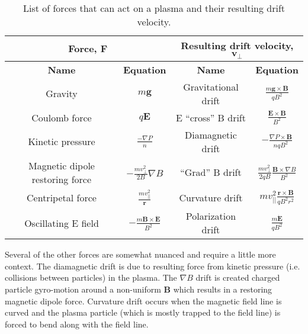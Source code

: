 \documentclass[12pt]{iopart}
\begin{document}
\renewcommand{\arraystretch}{1.5} %
\begin{table}[h]
\centering
\begin{tabular}{|c|c|c|c|}
\hline
\multicolumn{2}{|c|}{\textbf{Force}, $\mathbf{F}$}    & \multicolumn{2}{c|}{\textbf{Resulting drift velocity}, $\mathbf{v}_\perp$} \\ \hline 
\textbf{Name}       & \textbf{Equation} & \textbf{Name}       & \textbf{Equation}      \\ \hline
Gravity             & $m\mathbf{g}$                &      Gravitational drift               &           $\frac{m \mathbf{g} \times \mathbf{B}}{qB^2}$             \\ \hline
Coulomb force      & $q\mathbf{E}$                &       E ``cross'' B drift              &      $\frac{ \mathbf{E} \times \mathbf{B}}{B^2}$                      \\ \hline
Kinetic pressure    &          $\frac{ - \nabla P}{n}$         &        Diamagnetic drift             &     $-\frac{ \nabla P \times \mathbf{B}}{nqB^2}$                       \\ \hline
Magnetic dipole restoring force     &   $-\frac{mv_\perp^2}{2B} \nabla B$                &     ``Grad'' B drift                &           $\frac{m v_\perp^2}{2qB}\frac{\mathbf{B} \times \nabla B}{B^2}$             \\ \hline
Centripetal force          & $\frac{mv_{||}^2}{\mathbf{r}}$          &         Curvature drift            &       $ m v_{||}^2 \frac{\mathbf{r}\times\mathbf{B}}{qB^2r^2}$              \\ \hline
Oscillating E field & $-\frac{m\mathbf{B}\times\mathbf{\dot{E}}}{B^2}$      &    Polarization drift                 &  $\frac{m \mathbf{\dot{E}}}{qB^2} $                      \\ \hline
\end{tabular}
\caption{\label{tab:drift_summary}List of forces that can act on a plasma and their resulting drift velocity. }
\end{table}

Several of the other forces are somewhat nuanced and require a little more context.  The diamagnetic drift is due to resulting force from kinetic pressure (i.e. collisions between particles) in the plasma.  The $\nabla B$ drift is created charged particle gyro-motion around a  non-uniform $\mathbf{B}$ which results in a restoring magnetic dipole force.  Curvature drift occurs when the magnetic field line is curved and the plasma particle (which is mostly trapped to the field line) is forced to bend along with the field line.  
\end{document}
